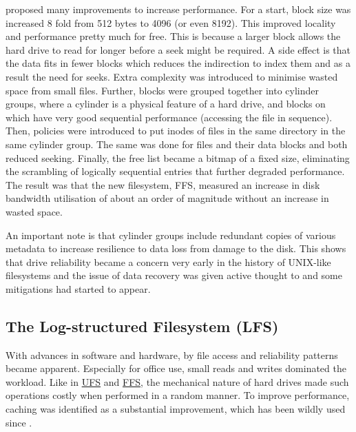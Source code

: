              proposed many improvements to increase
            performance. For a start, block size was increased 8 fold from 512
            bytes to 4096 (or even 8192). This improved locality and
            performance pretty much for free. This is because a larger block
            allows the hard drive to read for longer before a seek might be
            required. A side effect is that the data fits in fewer blocks which
            reduces the indirection to index them and as a result the need for
            seeks. Extra complexity was introduced to minimise wasted space
            from small files. Further, blocks were grouped together into
            cylinder groups, where a cylinder is a physical feature of a hard
            drive, and blocks on which have very good sequential performance
            (accessing the file in sequence). Then, policies were introduced to
            put inodes of files in the same directory in the same cylinder
            group. The same was done for files and their data blocks and both reduced seeking. Finally, the
            free list became a bitmap of a fixed size, eliminating the
            scrambling of logically sequential entries that further degraded
            performance. The result was that the new filesystem, FFS, measured an increase in disk
            bandwidth utilisation of about an order of magnitude without an
            increase in wasted space.

            An important note is that cylinder groups include redundant copies
            of various metadata to increase resilience to data loss from damage
            to the disk. This shows that drive reliability became a concern very
            early in the history of UNIX-like filesystems and the issue of data
            recovery was given active thought to and some mitigations had started to appear.

        \subsection{The Log-structured Filesystem (LFS)}
            \label{sec:LFS}

            With advances in software and hardware, by 
            file access and reliability patterns became apparent. Especially
            for office use, small reads and writes dominated the workload. Like
            in \hyperref[sec:UFS]{UFS} and \hyperref[sec:FFS]{FFS}, the mechanical
            nature of hard drives made such operations costly when performed in
            a random manner. To improve performance, caching was identified as
            a substantial improvement, which has been wildly used since
            \cite{IO_bottleneck, Linux_VFS_cache}.


